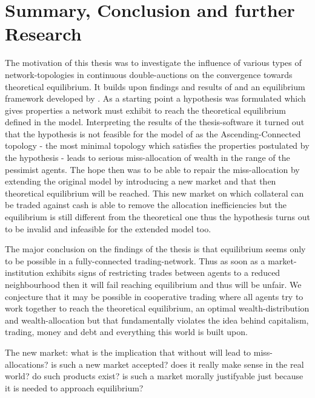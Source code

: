 \documentclass[Bachelorarbeit.tex]{subfiles}
\begin{document}
\chapter{Summary, Conclusion and further Research}

The motivation of this thesis was to investigate the influence of various types of network-topologies in continuous double-auctions on the convergence towards theoretical equilibrium. It builds upon findings and results of \cite{Breuer2015} and an equilibrium framework developed by \cite{Geanakoplos2009}. As a starting point a hypothesis was formulated which gives properties a network must exhibit to reach the theoretical equilibrium defined in the model. Interpreting the results of the thesis-software it turned out that the hypothesis is not feasible for the model of \cite{Breuer2015} as the Ascending-Connected topology - the most minimal topology which satisfies the properties postulated by the hypothesis - leads to serious miss-allocation of wealth in the range of the pessimist agents. The hope then was to be able to repair the miss-allocation by extending the original model by introducing a new market and that then theoretical equilibrium will be reached. This new market on which collateral can be traded against cash is able to remove the allocation inefficiencies but the equilibrium is still different from the theoretical one thus the hypothesis turns out to be invalid and infeasible for the extended model too.

\bigskip

The major conclusion on the findings of the thesis is that equilibrium seems only to be possible in a fully-connected trading-network. Thus as soon as a market-institution exhibits signs of restricting trades between agents to a reduced neighbourhood then it will fail reaching equilibrium and thus will be unfair. We conjecture that it may be possible in cooperative trading where all agents try to work together to reach the theoretical equilibrium, an optimal wealth-distribution and wealth-allocation but that fundamentally violates the idea behind capitalism, trading, money and debt and everything this world is built upon.

\bigskip

The new market: what is the implication that without will lead to miss-allocations? is such a new market accepted? does it really make sense in the real world? do such products exist? is such a market morally justifyable just because it is needed to approach equilibrium?
\end{document}
